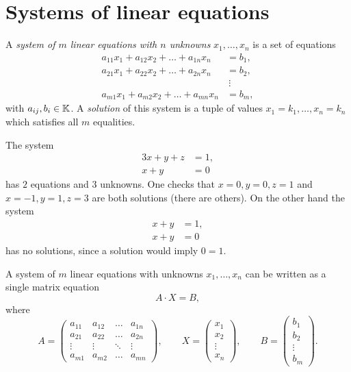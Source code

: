 \section{Systems of linear equations}

\begin{definition}
A \emph{system of $m$ linear equations with $n$ unknowns} $x_1,\ldots,x_n$ is a set of equations
\[
\begin{aligned}
a_{11} x_1 + a_{12} x_2 +\ldots+ a_{1n} x_n &= b_1,\\
a_{21} x_1 + a_{22} x_2 +\ldots+ a_{2n} x_n &= b_2,\\
&\ \vdots \\
a_{m1} x_1 + a_{m2} x_2 +\ldots+ a_{mn} x_n &= b_m,
\end{aligned}
\]
with $a_{ij}, b_i\in\mathbb{K}$. A \emph{solution} of this system is a tuple of values $x_1 = k_1,\ldots, x_n=k_n$
which satisfies all $m$ equalities.
\end{definition}

\begin{example}
The system
\[
\begin{aligned}
3x + y + z &= 1,\\
x + y &= 0
\end{aligned}
\]
has $2$ equations and $3$ unknowns. One checks that $x=0,y=0,z=1$ and $x=-1,y=1,z=3$ are both solutions
(there are others). On the other hand the system
\[
\begin{aligned}
x + y &= 1,\\
x + y &= 0
\end{aligned}
\]
has no solutions, since a solution would imply $0=1$.
\end{example}

\begin{observation}
A system of $m$ linear equations with unknowns $x_1,\ldots,x_n$ can be written as a single matrix equation
\[
A\cdot X = B,
\]
where
\[
A = \left( \begin{array}{cccc}
a_{11} & a_{12} & \ldots & a_{1n} \\
a_{21} & a_{22} & \ldots & a_{2n} \\
\vdots & \vdots & \ddots & \vdots \\
a_{m1} & a_{m2} & \ldots & a_{mn}
\end{array} \right), \qquad
X = \left ( \begin{array}{c} x_1 \\ x_2 \\ \vdots \\ x_n \end{array} \right ), \qquad
B = \left ( \begin{array}{c} b_1 \\ b_2 \\ \vdots \\ b_m \end{array} \right ).
\]
\end{observation}

